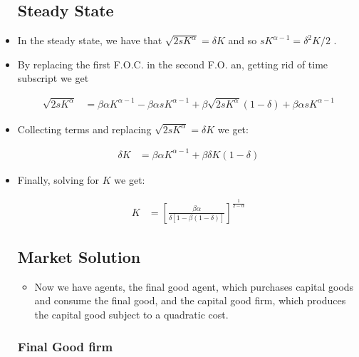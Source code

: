 \documentclass[11pt]{article}
\numberwithin{equation}{section}
\begin{document}
\begin{itemize}
	\subsection{Steady State}
	
	\item In the steady state, we have that $\sqrt{2 s K^\alpha} = \delta K$ and so $s K^{\alpha-1} =\delta^2 K/2$ .
	
	\item By replacing the first F.O.C. in the second F.O. an, getting rid of time subscript we get
	
	\begin{align} \sqrt{2 s K^\alpha}& = \beta \alpha K^{\alpha-1}  - \beta \alpha s K^{\alpha-1} +\beta \sqrt{2 s K^\alpha} (1-\delta) + \beta \alpha s  K^{\alpha-1}
	\end{align}
	
	\item Collecting terms and replacing $\sqrt{2 s K^\alpha} = \delta K$ we get:
	
	\begin{align} \delta K & = \beta \alpha K^{\alpha-1} +\beta \delta K (1-\delta) 
	\end{align}
	
	\item Finally, solving for $K$ we get:
	
		\begin{align}  K & = \left[\frac{\beta \alpha}{\delta[1-\beta(1-\delta)]} \right]^\frac{1}{2-\alpha}
	\end{align}
	
	
	\subsection{Market Solution}
	
	\begin{itemize}
		\item Now we have agents, the final good agent, which purchases capital goods and consume the final good, and the capital good firm, which produces the capital good subject to a quadratic cost. 
	\end{itemize}
	
	\subsubsection{Final Good firm}
	
	\begin{itemize}
		

\end{itemize}
\end{itemize}
\end{document}
